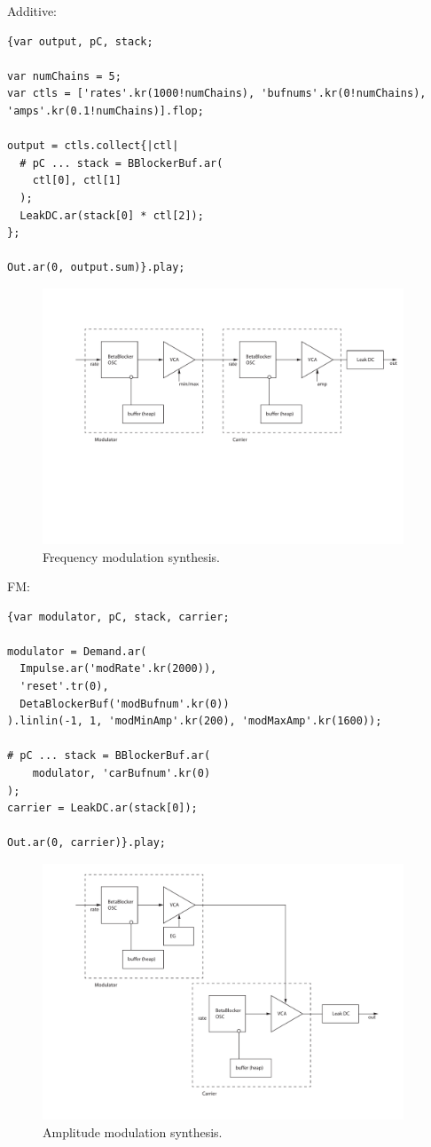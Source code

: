 \documentclass[letterpaper, 12pt]{article}
\begin{document}
Additive:
\begin{Verbatim}[fontfamily=courier, xleftmargin=\parindent]
{var output, pC, stack;

var numChains = 5;
var ctls = ['rates'.kr(1000!numChains), 'bufnums'.kr(0!numChains), 'amps'.kr(0.1!numChains)].flop;

output = ctls.collect{|ctl|
  # pC ... stack = BBlockerBuf.ar(
    ctl[0], ctl[1]
  );
  LeakDC.ar(stack[0] * ctl[2]);
};

Out.ar(0, output.sum)}.play;
\end{Verbatim}


\begin{figure}
	\centering
		\includegraphics[height=3in]{FM-Betablocker}
	\caption{Frequency modulation synthesis.}
	\label{fig:fig_FM-Betablocker}
\end{figure}

FM:
\begin{Verbatim}[fontfamily=courier, xleftmargin=\parindent]
{var modulator, pC, stack, carrier;

modulator = Demand.ar(
  Impulse.ar('modRate'.kr(2000)), 
  'reset'.tr(0),
  DetaBlockerBuf('modBufnum'.kr(0))
).linlin(-1, 1, 'modMinAmp'.kr(200), 'modMaxAmp'.kr(1600));

# pC ... stack = BBlockerBuf.ar(
	modulator, 'carBufnum'.kr(0)
);
carrier = LeakDC.ar(stack[0]);

Out.ar(0, carrier)}.play;
\end{Verbatim}


\begin{figure}
	\centering
		\includegraphics[height=3in]{AM-Betablocker}
	\caption{Amplitude modulation synthesis.}
	\label{fig:fig_AM-Betablocker}
\end{figure}
\end{document}
